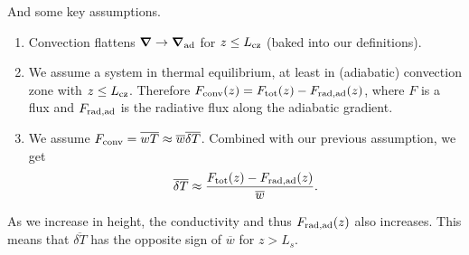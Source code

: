 \documentclass[12pt]{article}
\renewcommand{\vec}[1]{\boldsymbol{#1}}
\newcommand{\grad}{\vec{\nabla}}
\begin{document}
And some key assumptions.
\begin{enumerate}
\item Convection flattens $\grad \rightarrow \grad_{\rm{ad}}$ for $z \leq L_{\rm{cz}}$ (baked into our definitions).
\item We assume a system in thermal equilibrium, at least in (adiabatic) convection zone with $z \leq L_{\rm{cz}}$.
Therefore $F_{\rm{conv}}(z) = F_{\rm{tot}}(z) - F_{\rm{rad, ad}}(z)$, where $F$ is a flux and $F_{\rm{rad, ad}}$ is the radiative flux along the adiabatic gradient.
\item We assume $F_{\rm{conv}} = \overline{w T} \approx \overline{w}\overline{\delta T}$.
Combined with our previous assumption, we get
\begin{equation}
\overline{\delta T} \approx \frac{F_{\rm{tot}}(z) - F_{\rm{rad, ad}}(z)}{\overline{w}}.
\label{eqn:dT_assumption}
\end{equation}
\end{enumerate}
As we increase in height, the conductivity and thus $F_{\rm{rad, ad}}(z)$ also increases.
This means that $\overline{\delta T}$ has the opposite sign of $\overline{w}$ for $z > L_s$.
\end{document}
